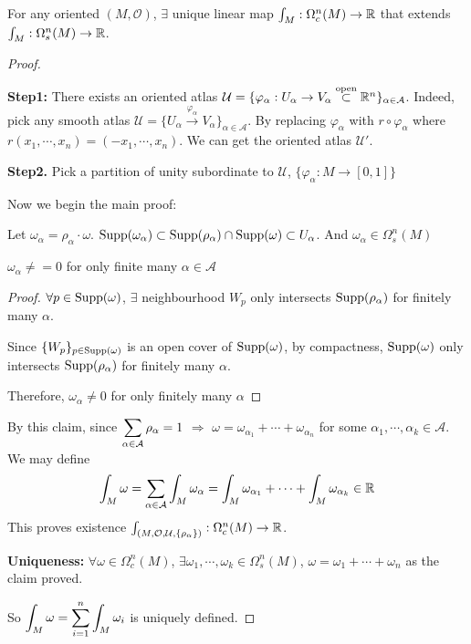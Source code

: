 \begin{theorem}
    For any oriented  $ (M,\mathcal{O}) $,  $ \exists $ unique linear map  $ \int_M:\Omega_c^n(M)\rightarrow\mathbb R $ that extends  $ \int_M:\Omega_s^n(M)\rightarrow \mathbb R $.   
\end{theorem}
\begin{proof}
    \,

    
    {\noindent\textbf{Step1:} There exists an oriented atlas  $ \mathcal{U}=\{\varphi_\alpha:U_\alpha\rightarrow V_\alpha\overset{\text{open}}{\subset}\mathbb R^n\}_{\alpha\in \mathcal{A}} $.
    }
    Indeed, pick any smooth atlas  $ \mathcal{U}=\{U_\alpha\xrightarrow{\varphi_\alpha} V_\alpha\}_{\alpha\in\mathcal{A}} $. By replacing  $ \varphi_\alpha $ with  $ r\circ \varphi_\alpha $ where  $ r(x_1,\cdots,x_n)=(-x_1,\cdots,x_n) $. We can get the oriented atlas  $ \mathcal{U}' $.
    
    {\noindent\textbf{Step2.} Pick a partition of unity subordinate to  $ \mathcal{U} $, $ \{\varphi_\alpha:M\rightarrow [0,1]\} $ }

    Now we begin the main proof:

    Let  $ \omega_\alpha=\rho_\alpha\cdot \omega $.  $ \mathrm{Supp}(\omega_\alpha)\subset \mathrm{Supp}(\rho_\alpha)\cap \mathrm{Supp}(\omega)\subset U_\alpha $. And  $ \omega_\alpha\in\Omega_s^n(M) $ 
    \begin{claim}
         $ \omega_\alpha\neq=0 $ for only finite many  $ \alpha\in\mathcal{A} $ 
    \end{claim}  
    \begin{proof}
         $ \forall p\in \mathrm{Supp}(\omega) $,  $ \exists $ neighbourhood $ W_p $ only intersects  $ \mathrm{Supp}(\rho_\alpha) $ for finitely many  $ \alpha $.
        
         Since  $ \{W_p\}_{p\in\mathrm{Supp}(\omega)} $ is an open cover of  $ \mathrm{Supp}(\omega) $, by compactness,  $ \mathrm{Supp}(\omega) $ only intersects  $ \mathrm{Supp}(\rho_\alpha) $ for finitely many  $ \alpha $.
         
        Therefore,  $ \omega_\alpha\neq0 $ for only finitely many  $ \alpha $  
    \end{proof}
    By this claim, since  $ \displaystyle\sum_{\alpha\in\mathcal{A}}\rho_\alpha=1 $ $ \Rightarrow $  $ \omega=\omega_{\alpha_1}+\cdots+\omega_{\alpha_n} $ for some  $ \alpha_1,\cdots,\alpha_k\in\mathcal{A} $.
    We may define 
    \begin{equation}
        \int_M\omega=\displaystyle\sum_{\alpha\in\mathcal{A}}\int_M\omega_\alpha=\int_M\omega_{\alpha_1}+\cdots+\int_M\omega_{\alpha_k}\in \mathbb R
    \end{equation}
    This proves existence  $ \int_{(M,\mathcal{O},\mathcal{U},\{\rho_\alpha\})}:\Omega_c^n(M)\rightarrow\mathbb R $.
    
    \textbf{Uniqueness:} $ \forall \omega\in \Omega_c^n(M) $,  $ \exists \omega_1,\cdots,\omega_k\in\Omega_s^n(M) $,  $ \omega=\omega_1+\cdots+\omega_n $ as the claim proved.
    
    So  $ \displaystyle\int_M\omega=\sum_{i=1}^n\int_M\omega_i $ is uniquely defined. 
\end{proof}

